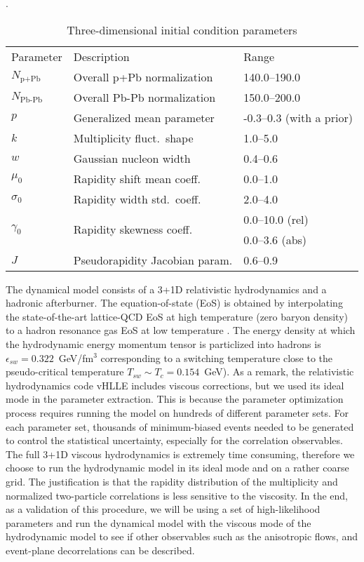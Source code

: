 \begin{table}
\centering
\caption{Three-dimensional initial condition parameters}
\label{tab:trento:parameters}.
\begin{tabular}{lll}
      Parameter & Description	& Range \\
      \paddedhline
      $N_{\textrm{p+Pb}}$    & Overall p+Pb normalization      & 140.0--190.0 \\
      $N_{\textrm{Pb-Pb}}$   & Overall Pb-Pb normalization     & 150.0--200.0  \\
      $p$	                   & Generalized mean parameter      & -0.3--0.3 (with a prior)  \\
      $k$	                   & Multiplicity fluct.\ shape      & 1.0--5.0  \\
      $w$	                   & Gaussian nucleon width     & 0.4--0.6  \\
      $\mu_0$                & Rapidity shift mean coeff.\     & 0.0--1.0  \\
      $\sigma_0$             & Rapidity width std.\ coeff.\    & 2.0--4.0  \\
      \multirow{2}{*}{$\gamma_0$}             & \multirow{2}{*}{Rapidity skewness coeff.\ }      & 0.0--10.0 (rel) \\
                  &        & 0.0--3.6 (abs)  \\
      $J$	                   & Pseudorapidity Jacobian param.  & 0.6--0.9
\end{tabular}  
\end{table}

The dynamical model consists of a 3+1D relativistic hydrodynamics and a hadronic afterburner.
The equation-of-state (EoS) is obtained by interpolating the state-of-the-art lattice-QCD EoS \cite{Bazavov:2014pvz} at high temperature (zero baryon density) to a hadron resonance gas EoS at low temperature \cite{Moreland:2015dvc}.
The energy density at which the hydrodynamic energy momentum tensor is particlized into hadrons is $\epsilon_{sw} = 0.322$~GeV/fm$^3$ corresponding to a switching temperature close to the pseudo-critical temperature $T_{sw} \sim T_c = 0.154$~GeV).
As a remark, the relativistic hydrodynamics code vHLLE \cite{Karpenko:2013wva} includes viscous corrections, but we used its ideal mode in the parameter extraction.
This is because the parameter optimization process requires running the model on hundreds of different parameter sets.
For each parameter set, thousands of minimum-biased events needed to be generated to control the statistical uncertainty, especially for the correlation observables. 
The full 3+1D viscous hydrodynamics is extremely time consuming, therefore we choose to run the hydrodynamic model in its ideal mode and on a rather coarse grid.
The justification is that the rapidity distribution of the multiplicity and normalized two-particle correlations is less sensitive to the viscosity.
In the end, as a validation of this procedure, we will be using a set of high-likelihood parameters and run the dynamical model with the viscous mode of the hydrodynamic model to see if other observables such as the anisotropic flows, and event-plane decorrelations can be described.

